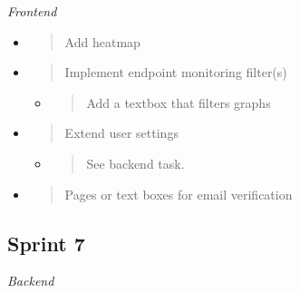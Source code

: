 \emph{Frontend}

\begin{itemize}
\item
  \begin{quote}
  Add heatmap
  \end{quote}
\item
  \begin{quote}
  Implement endpoint monitoring filter(s)
  \end{quote}

  \begin{itemize}
  \item
    \begin{quote}
    Add a textbox that filters graphs
    \end{quote}
  \end{itemize}
\item
  \begin{quote}
  Extend user settings
  \end{quote}

  \begin{itemize}
  \item
    \begin{quote}
    See backend task.
    \end{quote}
  \end{itemize}
\item
  \begin{quote}
  Pages or text boxes for email verification
  \end{quote}
\end{itemize}


\hypertarget{sprint-7}{%
\subsection{Sprint 7}\label{sprint-7}}


\emph{Backend}

